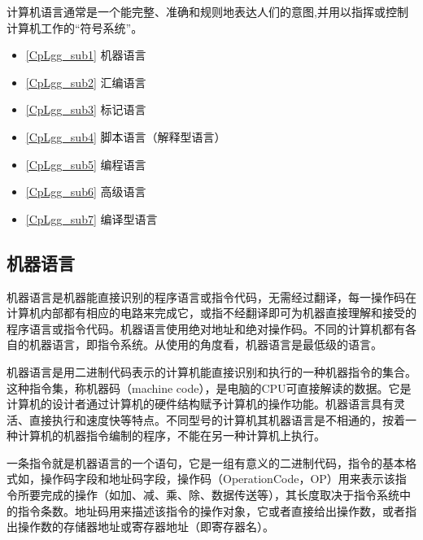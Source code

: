 
\begin{issues}
\issueTODO
\end{issues}

计算机语言通常是一个能完整、准确和规则地表达人们的意图,并用以指挥或控制计算机工作的“符号系统”。

\begin{itemize}
\item \autoref{CpLgg_sub1} 机器语言

\item \autoref{CpLgg_sub2} 汇编语言

\item \autoref{CpLgg_sub3} 标记语言

\item \autoref{CpLgg_sub4} 脚本语言（解释型语言）

\item \autoref{CpLgg_sub5} 编程语言

\item \autoref{CpLgg_sub6} 高级语言

\item \autoref{CpLgg_sub7} 编译型语言
\end{itemize}

\subsection{机器语言}\label{CpLgg_sub1}

机器语言是机器能直接识别的程序语言或指令代码，无需经过翻译，每一操作码在计算机内部都有相应的电路来完成它，或指不经翻译即可为机器直接理解和接受的程序语言或指令代码。机器语言使用绝对地址和绝对操作码。不同的计算机都有各自的机器语言，即指令系统。从使用的角度看，机器语言是最低级的语言。

机器语言是用二进制代码表示的计算机能直接识别和执行的一种机器指令的集合。这种指令集，称机器码（machine code），是电脑的CPU可直接解读的数据。它是计算机的设计者通过计算机的硬件结构赋予计算机的操作功能。机器语言具有灵活、直接执行和速度快等特点。不同型号的计算机其机器语言是不相通的，按着一种计算机的机器指令编制的程序，不能在另一种计算机上执行。

一条指令就是机器语言的一个语句，它是一组有意义的二进制代码，指令的基本格式如，操作码字段和地址码字段，操作码（OperationCode，OP）用来表示该指令所要完成的操作（如加、减、乘、除、数据传送等），其长度取决于指令系统中的指令条数。地址码用来描述该指令的操作对象，它或者直接给出操作数，或者指出操作数的存储器地址或寄存器地址（即寄存器名）。

